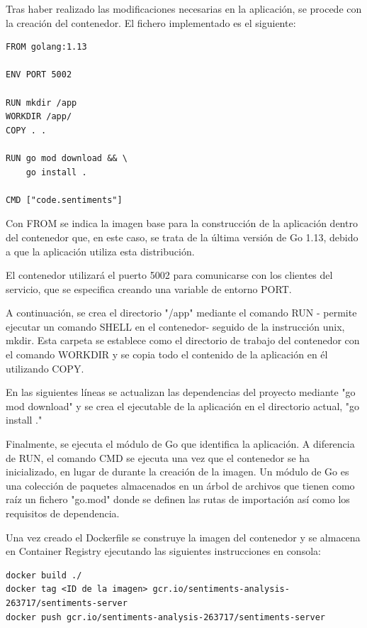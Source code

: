 Tras haber realizado las modificaciones necesarias en la aplicación, se procede con la creación del contenedor. El fichero implementado es el siguiente:

\begin{lstlisting}[caption= Dockerfile an\'alisis de sentimientos]
FROM golang:1.13

ENV PORT 5002

RUN mkdir /app
WORKDIR /app/
COPY . .

RUN go mod download && \
    go install .

CMD ["code.sentiments"]
\end{lstlisting}

Con FROM se indica la imagen base para la construcción de la aplicación dentro del contenedor que, en este caso, se trata de la última versión de Go 1.13, debido a que la aplicación utiliza esta distribución.

El contenedor utilizará el puerto 5002 para comunicarse con los clientes del servicio, que se especifica creando una variable de entorno PORT.

A continuación, se crea el directorio "/app" mediante el comando RUN  - permite ejecutar un comando SHELL en el contenedor- seguido de la instrucción unix, mkdir. Esta carpeta se establece como el directorio de trabajo del contenedor con el comando WORKDIR y se copia todo el contenido de la aplicación en él utilizando COPY.

En las siguientes líneas se actualizan las dependencias del proyecto mediante "go mod download" y se crea el ejecutable de la aplicación en el directorio actual, "go install ."

Finalmente, se ejecuta el módulo de Go que identifica la aplicación. A diferencia de RUN, el comando CMD se ejecuta una vez que el contenedor se ha inicializado, en lugar de durante la creación de la imagen. Un módulo de Go es una colección de paquetes almacenados en un árbol de archivos que tienen como raíz un fichero "go.mod" donde se definen las rutas de importación así como los requisitos de dependencia.

Una vez creado el Dockerfile se construye la imagen del contenedor y se almacena en Container Registry ejecutando las siguientes instrucciones en consola:
\begin{lstlisting}[caption= Crear y subir imagen del contenedor a Container Registry]
docker build ./
docker tag <ID de la imagen> gcr.io/sentiments-analysis-263717/sentiments-server
docker push gcr.io/sentiments-analysis-263717/sentiments-server
\end{lstlisting}

